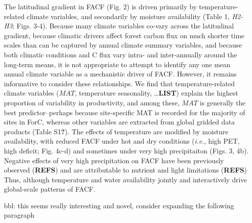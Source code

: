 \documentclass[]{article}
\begin{document}
The latitudinal gradient in FACF (Fig. 2) is driven primarily by
temperature-related climate variables, and secondarily by moisture
availability (Table 1, \emph{H2-H3}; Figs. 3-4). Because many climate
variables co-vary across the latitudinal gradient, because climatic
drivers affect forest carbon flux on much shorter time scales than can
be captured by annual climate summary variables, and because both
climatic conditions and C flux vary intra- and inter-annually around the
long-term means, it is not appropriate to attempt to identify any one
mean annual climate variable as a mechanistic driver of FACF. However,
it remains informative to consider these relationships. We find that
temperature-related climate variables (\(MAT\), temperature seasonality,
\ldots{}\textbf{LIST}) explain the highest proportion of variability in
productivity, and among these, \(MAT\) is generally the best
predictor--perhaps because site-specific MAT is recorded for the
majority of sites in ForC, whereas other variables are extracted from
global gridded data products (Table S1\textbf{?}). The effects of
temperature are modified by moisture availability, with reduced FACF
under hot and dry conditions (\emph{i.e.}, high PET, high deficit; Fig.
4c-d) and sometimes under very high precipitaiton (Figs. 3, 4b).
Negative effects of very high precipitation on FACF have been previously
observed (\textbf{REFS}) and are attributable to nutrient and light
limitations (\textbf{REFS}) Thus, although temperature and water
availability jointly and interactively drive global-scale patterns of
FACF.

bbl: this seems really interesting and novel, consider expanding the
following paragraph
\end{document}
